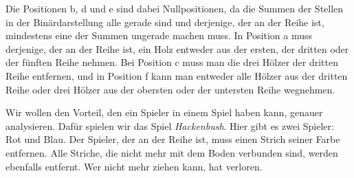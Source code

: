 \documentclass{zusammenfassung}
\begin{document}
\begin{aufgabe}
\begin{center}
  \end{center}
\end{aufgabe}

Die Positionen b, d und e sind dabei Nullpositionen, da die Summen der Stellen in der Binärdarstellung alle gerade sind und
derjenige, der an der Reihe ist, mindestens eine der Summen ungerade machen muss. In Position a muss derjenige, der an der Reihe
ist, ein Holz entweder aus der ersten, der dritten oder der fünften Reihe nehmen. Bei Position c muss man die drei Hölzer der
dritten Reihe entfernen, und in Position f kann man entweder alle Hölzer aus der dritten Reihe oder drei Hölzer aus der obersten
oder der untersten Reihe wegnehmen.

Wir wollen den Vorteil, den ein Spieler in einem Spiel haben kann, genauer analysieren. Dafür spielen wir das Spiel
\emph{Hackenbush}. Hier gibt es zwei Spieler: Rot und Blau. Der Spieler, der an der Reihe ist, muss einen Strich seiner Farbe
entfernen. Alle Striche, die nicht mehr mit dem Boden verbunden sind, werden ebenfalls entfernt. Wer nicht mehr ziehen kann, hat
verloren.
\end{document}
